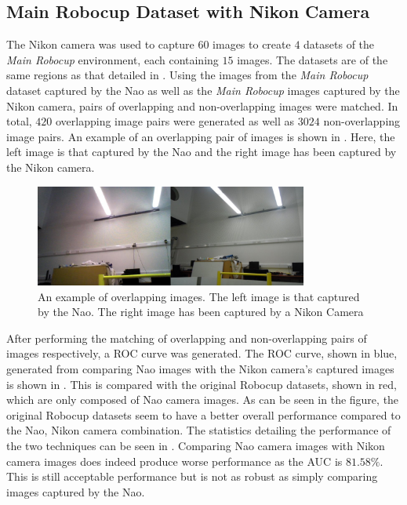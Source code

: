 \documentclass[11pt]{report}
\begin{document}
\subsection{Main Robocup Dataset with Nikon Camera}
\label{sec:nikonRobocup}

The Nikon camera was used to capture $60$ images to create $4$ datasets of the \textit{Main Robocup} environment, each containing $15$ images. The datasets are of the same regions as that detailed in . Using the images from the \textit{Main Robocup} dataset captured by the Nao as well as the \textit{Main Robocup} images captured by the Nikon camera, pairs of overlapping and non-overlapping images were matched. In total, $420$ overlapping image pairs were generated as well as $3024$ non-overlapping image pairs. An example of an overlapping pair of images is shown in . Here, the left image is that captured by the Nao and the right image has been captured by the Nikon camera.\\

\begin{figure}[h!] 
  \centering
    \includegraphics[width=0.8\textwidth]{../Drawings/camera/compareRobocup.jpg}
    \caption{An example of overlapping images. The left image is that captured by the Nao. The right image has been captured by a Nikon Camera}
    \label{fig:cameraOverlapRobocup}
\end{figure}

After performing the matching of overlapping and non-overlapping pairs of images respectively, a ROC curve was generated. The ROC curve, shown in blue, generated from comparing Nao images with the Nikon camera's captured images is shown in . This is compared with the original Robocup datasets, shown in red, which are only composed of Nao camera images. As can be seen in the figure, the original Robocup datasets seem to have a better overall performance compared to the Nao, Nikon camera combination. The statistics detailing the performance of the two techniques can be seen in . Comparing Nao camera images with Nikon camera images does indeed produce worse performance as the AUC is $81.58\%$. This is still acceptable performance but is not as robust as simply comparing images captured by the Nao.\\
\end{document}

